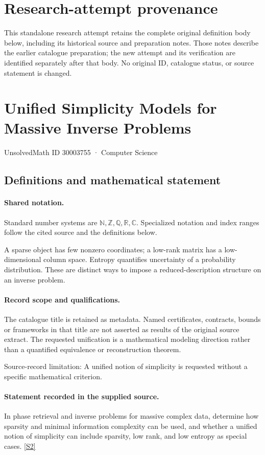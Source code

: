 \documentclass[11pt]{article}
\begin{document}
\section*{Research-attempt provenance}
This standalone research attempt retains the complete original definition body below,
including its historical source and preparation notes. Those notes describe the
earlier catalogue preparation; the new attempt and its verification are identified
separately after that body. No original ID, catalogue status, or source statement is changed.

\section{Unified Simplicity Models for Massive Inverse Problems}\label{30003755}
{\small UnsolvedMath ID 30003755 · Computer Science}
\subsection{Definitions and mathematical statement}

\paragraph{Shared notation.}Standard number systems are $\mathbb N,\mathbb Z,\mathbb Q,\mathbb R,\mathbb C$. Specialized notation and index ranges follow the cited source and the definitions below.


A sparse object has few nonzero coordinates; a low-rank matrix has a low-dimensional column space. Entropy quantifies uncertainty of a probability distribution. These are distinct ways to impose a reduced-description structure on an inverse problem.
\paragraph{Record scope and qualifications.}
The catalogue title is retained as metadata. Named certificates, contracts, bounds or frameworks in that title are not asserted as results of the original source extract.
The requested unification is a mathematical modeling direction rather than a quantified equivalence or reconstruction theorem.

Source-record limitation: A unified notion of simplicity is requested without a specific mathematical criterion.
\paragraph{Statement recorded in the supplied source.}
In phase retrieval and inverse problems for massive complex data, determine how sparsity and minimal information complexity can be used, and whether a unified notion of simplicity can include sparsity, low rank, and low entropy as special cases. \href{https://doi.org/10.4171/owr/2018/14}{[S2]}
\end{document}
